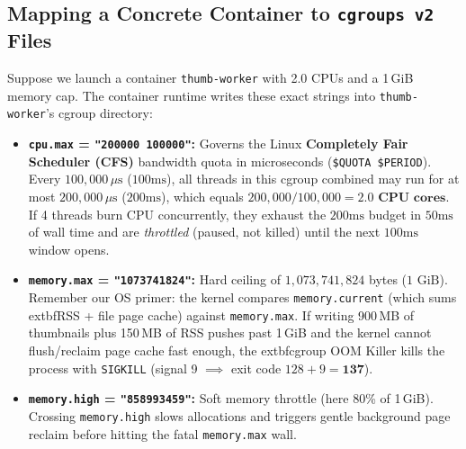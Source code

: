 \subsection{Mapping a Concrete Container to \texttt{cgroups v2} Files}
Suppose we launch a container \texttt{thumb-worker} with 2.0 CPUs and a 1\,GiB memory cap. The container runtime writes these exact strings into \texttt{thumb-worker}'s cgroup directory:
\begin{itemize}[leftmargin=12pt]
  \item \textbf{\texttt{cpu.max} = \texttt{"200000 100000"}:} Governs the Linux \textbf{Completely Fair Scheduler (CFS)} bandwidth quota in microseconds (\texttt{\$QUOTA \$PERIOD}). Every $100{,}000\,\mu\text{s}$ ($100\text{ms}$), all threads in this cgroup combined may run for at most $200{,}000\,\mu\text{s}$ ($200\text{ms}$), which equals $200{,}000 / 100{,}000 = \mathbf{2.0\text{ CPU cores}}$. If 4 threads burn CPU concurrently, they exhaust the $200\text{ms}$ budget in $50\text{ms}$ of wall time and are \emph{throttled} (paused, not killed) until the next $100\text{ms}$ window opens.
  \item \textbf{\texttt{memory.max} = \texttt{"1073741824"}:} Hard ceiling of $1{,}073{,}741{,}824$ bytes ($1\text{ GiB}$). Remember our OS primer: the kernel compares \texttt{memory.current} (which sums 	extbf{RSS + file page cache}) against \texttt{memory.max}. If writing 900\,MB of thumbnails plus 150\,MB of RSS pushes past 1\,GiB and the kernel cannot flush/reclaim page cache fast enough, the 	extbf{cgroup OOM Killer} kills the process with \texttt{SIGKILL} (signal 9 $\implies$ exit code $128 + 9 = \mathbf{137}$).
  \item \textbf{\texttt{memory.high} = \texttt{"858993459"}:} Soft memory throttle (here 80\% of 1\,GiB). Crossing \texttt{memory.high} slows allocations and triggers gentle background page reclaim before hitting the fatal \texttt{memory.max} wall.
\end{itemize}

